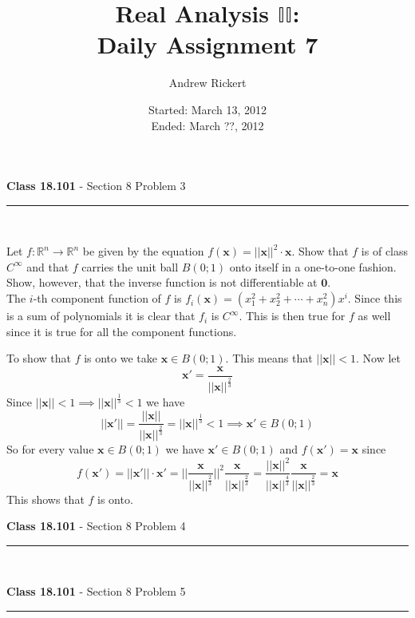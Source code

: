 \documentclass[11pt,reqno]{article}
\title{Real Analysis $\mathbb{II}$: \\ Daily Assignment 7}
\author{Andrew Rickert}
\date{Started: March 13, 2012 \\ \hspace{1pt} Ended: March ??,  2012}                                           %
\begin{document}
\maketitle

\begin{flushleft} 
\textbf{Class 18.101} - Section 8 Problem 3\\
\rule{500pt}{1pt}\\
\end{flushleft} 

Let $f : \mathbb{R}^n \to \mathbb{R}^n$ be given by the equation $f(\textbf{x}) = ||\textbf{x}||^2 \cdot \textbf{x}$. Show that $f$ is of class $C^\infty$ and that $f$ carries the unit ball $B(0;1)$ onto itself in a one-to-one fashion. Show, however, that the inverse function is not differentiable at $\textbf{0}$.\\

The $i$-th component function of $f$ is $f_i(\textbf{x}) = (x_1^2 + x_2^2 + \cdots + x_n^2) x^i$. Since this is a sum of polynomials it is clear that $f_i$ is $C^\infty$. This is then true for $f$ as well since it is true for all the component functions.

To show that $f$ is onto we take $\textbf{x} \in B(0;1)$. This means that $||\textbf{x}|| < 1$. Now let \[ \textbf{x}' = \frac{\textbf{x}}{||\textbf{x}||^{\frac{2}{3}}} \]
Since $||\textbf{x}|| < 1 \implies ||\textbf{x}||^{\frac{1}{3}} < 1$ we have 
\[ ||\textbf{x}'|| = \frac{||\textbf{x}||}{||\textbf{x}||^{\frac{2}{3}}} = ||\textbf{x}||^{\frac{1}{3}} < 1 \implies \textbf{x}' \in B(0;1) \]
So for every value $\textbf{x} \in B(0;1)$ we have $\textbf{x}' \in B(0;1)$ and $f(\textbf{x}') = \textbf{x}$ since 
\[ f(\textbf{x}') = ||\textbf{x}'|| \cdot \textbf{x}' = || \frac{\textbf{x}}{||\textbf{x}||^{\frac{2}{3}}} ||^2 \frac{\textbf{x}}{||\textbf{x}||^{\frac{2}{3}}} =  \frac{||\textbf{x}||^2}{||\textbf{x}||^{\frac{4}{3}}} \frac{\textbf{x}}{||\textbf{x}||^{\frac{2}{3}}} = \textbf{x} \]
This shows that $f$ is onto.

\begin{flushleft} 
\textbf{Class 18.101} - Section 8 Problem 4\\
\rule{500pt}{1pt}\\
\end{flushleft} 



\begin{flushleft} 
\textbf{Class 18.101} - Section 8 Problem 5\\
\rule{500pt}{1pt}\\
\end{flushleft} 
\end{document}
